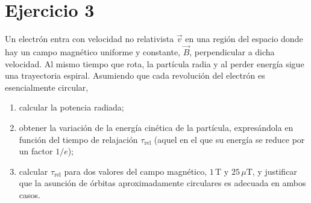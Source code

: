 \documentclass[11pt]{article}
\begin{document}
\brightmode
\maketitle
\section*{Ejercicio 3}
Un electrón entra con velocidad no relativista $\vec{v}$ en una región del espacio donde hay un campo magnético uniforme y constante, $\vec{B}$, perpendicular a dicha velocidad. Al mismo tiempo que rota, la partícula radia y al perder energía sigue una trayectoria espiral. Asumiendo que cada revolución del electrón es esencialmente circular, 
\begin{enumerate}[label=\roman*)]
    \item calcular la potencia radiada;
    \item obtener la variación de la energía cinética de la partícula, expresándola en función del tiempo de relajación $\tau_{\text{rel}}$ (aquel en el que su energía se reduce por un factor $1/e$);
    \item calcular $\tau_{\text{rel}}$ para dos valores del campo magnético, $1 \, \text{T}$ y $25 \, \mu\text{T}$, y justificar que la asunción de órbitas aproximadamente circulares es adecuada en ambos casos.
\end{enumerate}
\Resolucion
\end{document}
